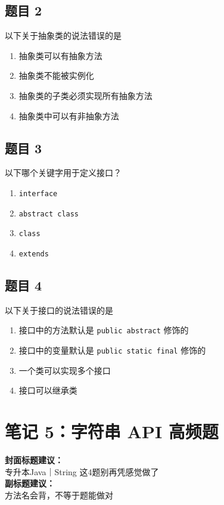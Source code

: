 \documentclass[12pt,a4paper]{ctexart}
\begin{document}
\subsection*{题目 2}
以下关于抽象类的说法错误的是
\begin{enumerate}[label=\Alph*.]
    \item 抽象类可以有抽象方法
    \item 抽象类不能被实例化
    \item 抽象类的子类必须实现所有抽象方法
    \item 抽象类中可以有非抽象方法
\end{enumerate}

\subsection*{题目 3}
以下哪个关键字用于定义接口？
\begin{enumerate}[label=\Alph*.]
    \item \texttt{interface}
    \item \texttt{abstract class}
    \item \texttt{class}
    \item \texttt{extends}
\end{enumerate}

\subsection*{题目 4}
以下关于接口的说法错误的是
\begin{enumerate}[label=\Alph*.]
    \item 接口中的方法默认是 \texttt{public abstract} 修饰的
    \item 接口中的变量默认是 \texttt{public static final} 修饰的
    \item 一个类可以实现多个接口
    \item 接口可以继承类
\end{enumerate}

\newpage

\section{笔记 5：字符串 API 高频题}
\begin{coverbox}
\textbf{封面标题建议：}\\
专升本Java｜String 这4题别再凭感觉做了\\
\textbf{副标题建议：}\\
方法名会背，不等于题能做对
\end{coverbox}
\end{document}

